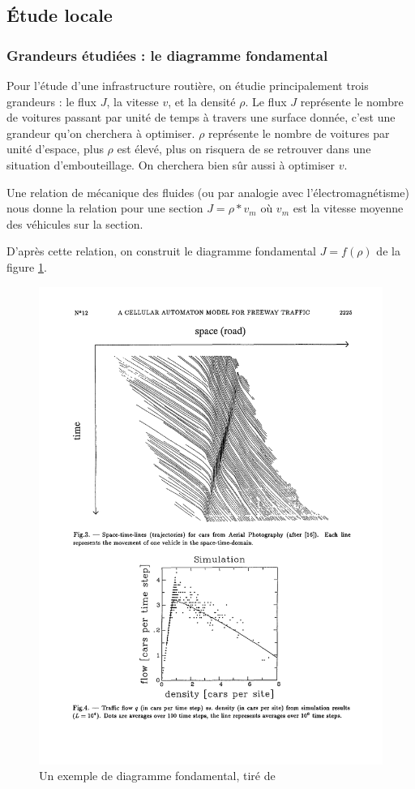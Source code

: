 \documentclass[11pt]{article}
\begin{document}
	\subsection{Étude locale}	
		\subsubsection{Grandeurs étudiées : le diagramme fondamental}

Pour l'étude d'une infrastructure routière, on étudie principalement trois grandeurs : le flux $J$, la vitesse $v$, et la densité $\rho$. Le flux $J$ représente le nombre de voitures passant par unité de temps à travers une surface donnée, c'est une grandeur qu'on cherchera à optimiser. $\rho$ représente le nombre de voitures par unité d'espace, plus $\rho$ est élevé, plus on risquera de se retrouver dans une situation d'embouteillage. On cherchera bien sûr aussi à optimiser $v$. \par
Une relation de mécanique des fluides (ou par analogie avec l'électromagnétisme) nous donne la relation pour une section $J = \rho * v_m $ où $v_m$ est la vitesse moyenne des véhicules sur la section.\par 
D'après cette relation, on construit le diagramme fondamental $J=f(\rho)$ de la figure \ref{dgf}.
\begin{figure}
	\begin{center}	
		\includegraphics[scale = 0.6]{./images/dfondcomp}
	\end{center}
	\caption{\label{dgf} Un exemple de diagramme fondamental, tiré de \cite{NaSch}}
\end{figure}
\end{document}
